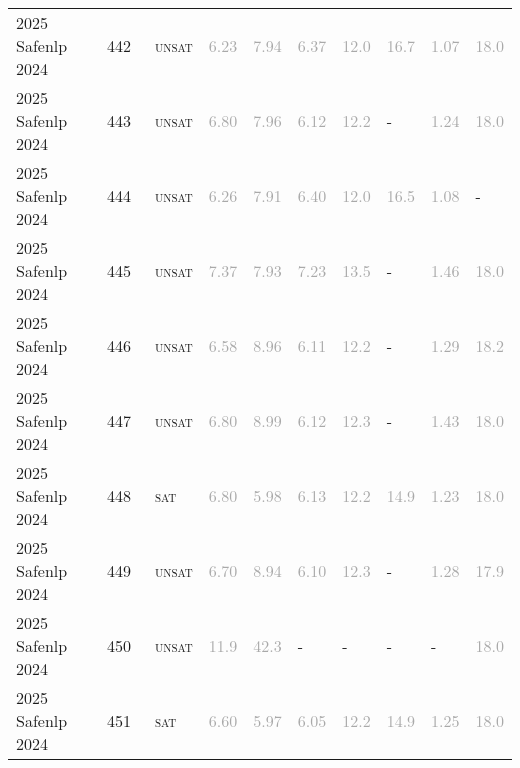 \begin{center}
{\begin{longtable}{@{}llllllllll@{}}
2025 Safenlp 2024 & 442 & ~\textsc{unsat} & \textcolor{darkgray}{6.23} & \textcolor{darkgray}{7.94} & \textcolor{darkgray}{6.37} & \textcolor{darkgray}{12.0} & \textcolor{darkgray}{16.7} & \textcolor{darkgray}{1.07} & \textcolor{darkgray}{18.0} \\
2025 Safenlp 2024 & 443 & ~\textsc{unsat} & \textcolor{darkgray}{6.80} & \textcolor{darkgray}{7.96} & \textcolor{darkgray}{6.12} & \textcolor{darkgray}{12.2} & - & \textcolor{darkgray}{1.24} & \textcolor{darkgray}{18.0} \\
2025 Safenlp 2024 & 444 & ~\textsc{unsat} & \textcolor{darkgray}{6.26} & \textcolor{darkgray}{7.91} & \textcolor{darkgray}{6.40} & \textcolor{darkgray}{12.0} & \textcolor{darkgray}{16.5} & \textcolor{darkgray}{1.08} & - \\
2025 Safenlp 2024 & 445 & ~\textsc{unsat} & \textcolor{darkgray}{7.37} & \textcolor{darkgray}{7.93} & \textcolor{darkgray}{7.23} & \textcolor{darkgray}{13.5} & - & \textcolor{darkgray}{1.46} & \textcolor{darkgray}{18.0} \\
2025 Safenlp 2024 & 446 & ~\textsc{unsat} & \textcolor{darkgray}{6.58} & \textcolor{darkgray}{8.96} & \textcolor{darkgray}{6.11} & \textcolor{darkgray}{12.2} & - & \textcolor{darkgray}{1.29} & \textcolor{darkgray}{18.2} \\
2025 Safenlp 2024 & 447 & ~\textsc{unsat} & \textcolor{darkgray}{6.80} & \textcolor{darkgray}{8.99} & \textcolor{darkgray}{6.12} & \textcolor{darkgray}{12.3} & - & \textcolor{darkgray}{1.43} & \textcolor{darkgray}{18.0} \\
2025 Safenlp 2024 & 448 & ~\textsc{sat} & \textcolor{darkgray}{6.80} & \textcolor{darkgray}{5.98} & \textcolor{darkgray}{6.13} & \textcolor{darkgray}{12.2} & \textcolor{darkgray}{14.9} & \textcolor{darkgray}{1.23} & \textcolor{darkgray}{18.0} \\
2025 Safenlp 2024 & 449 & ~\textsc{unsat} & \textcolor{darkgray}{6.70} & \textcolor{darkgray}{8.94} & \textcolor{darkgray}{6.10} & \textcolor{darkgray}{12.3} & - & \textcolor{darkgray}{1.28} & \textcolor{darkgray}{17.9} \\
2025 Safenlp 2024 & 450 & ~\textsc{unsat} & \textcolor{darkgray}{11.9} & \textcolor{darkgray}{42.3} & - & - & - & - & \textcolor{darkgray}{18.0} \\
2025 Safenlp 2024 & 451 & ~\textsc{sat} & \textcolor{darkgray}{6.60} & \textcolor{darkgray}{5.97} & \textcolor{darkgray}{6.05} & \textcolor{darkgray}{12.2} & \textcolor{darkgray}{14.9} & \textcolor{darkgray}{1.25} & \textcolor{darkgray}{18.0} \\

\end{longtable}}
\end{center}
